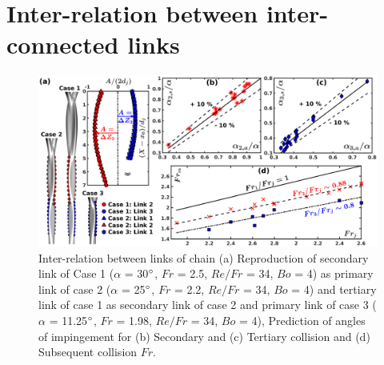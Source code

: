 \documentclass{jfm}
\begin{document}
\section{Inter-relation between inter-connected links} 
\begin{figure}
	\centering
	\includegraphics[width=\linewidth]{Figure8}
	\caption{Inter-relation between links of chain (a) Reproduction of secondary link of Case 1 ($\alpha$ = 30$\degree$, $Fr$ = 2.5, $Re/Fr$ = 34, $Bo$ = 4) as primary link of case 2 ($\alpha$ = 25$\degree$, $Fr$ = 2.2, $Re/Fr$ = 34, $Bo$ = 4) and tertiary link of case 1 as secondary link of case 2 and primary link of case 3 ($\alpha$ = 11.25$\degree$, $Fr$ = 1.98, $Re/Fr$ = 34, $Bo$ = 4), Prediction of angles of impingement for (b) Secondary and (c) Tertiary collision and (d) Subsequent collision $Fr$.}
	\label{Figure::secondCollision}%
\end{figure}
\end{document}
